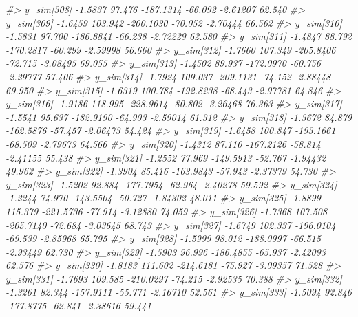 \documentclass[
  10pt,
  italian,
  a4paper,
  extrafontsizes,onecolumn,openright
  ]{memoir}
\newenvironment{Shaded}{\begin{snugshade}}{\end{snugshade}}
\newcommand{\CommentTok}[1]{\textcolor[rgb]{0.56,0.35,0.01}{\textit{#1}}}
\begin{document}
\begin{Shaded}
\begin{Highlighting}[]
\CommentTok{\#\textgreater{}   y\_sim[308] {-}1.5837  97.476 {-}187.1314 {-}66.092 {-}2.61207 62.540}
\CommentTok{\#\textgreater{}   y\_sim[309] {-}1.6459 103.942 {-}200.1030 {-}70.052 {-}2.70444 66.562}
\CommentTok{\#\textgreater{}   y\_sim[310] {-}1.5831  97.700 {-}186.8841 {-}66.238 {-}2.72229 62.580}
\CommentTok{\#\textgreater{}   y\_sim[311] {-}1.4847  88.792 {-}170.2817 {-}60.299 {-}2.59998 56.660}
\CommentTok{\#\textgreater{}   y\_sim[312] {-}1.7660 107.349 {-}205.8406 {-}72.715 {-}3.08495 69.055}
\CommentTok{\#\textgreater{}   y\_sim[313] {-}1.4502  89.937 {-}172.0970 {-}60.756 {-}2.29777 57.406}
\CommentTok{\#\textgreater{}   y\_sim[314] {-}1.7924 109.037 {-}209.1131 {-}74.152 {-}2.88448 69.950}
\CommentTok{\#\textgreater{}   y\_sim[315] {-}1.6319 100.784 {-}192.8238 {-}68.443 {-}2.97781 64.846}
\CommentTok{\#\textgreater{}   y\_sim[316] {-}1.9186 118.995 {-}228.9614 {-}80.802 {-}3.26468 76.363}
\CommentTok{\#\textgreater{}   y\_sim[317] {-}1.5541  95.637 {-}182.9190 {-}64.903 {-}2.59014 61.312}
\CommentTok{\#\textgreater{}   y\_sim[318] {-}1.3672  84.879 {-}162.5876 {-}57.457 {-}2.06473 54.424}
\CommentTok{\#\textgreater{}   y\_sim[319] {-}1.6458 100.847 {-}193.1661 {-}68.509 {-}2.79673 64.566}
\CommentTok{\#\textgreater{}   y\_sim[320] {-}1.4312  87.110 {-}167.2126 {-}58.814 {-}2.41155 55.438}
\CommentTok{\#\textgreater{}   y\_sim[321] {-}1.2552  77.969 {-}149.5913 {-}52.767 {-}1.94432 49.962}
\CommentTok{\#\textgreater{}   y\_sim[322] {-}1.3904  85.416 {-}163.9843 {-}57.943 {-}2.37379 54.730}
\CommentTok{\#\textgreater{}   y\_sim[323] {-}1.5202  92.884 {-}177.7954 {-}62.964 {-}2.40278 59.592}
\CommentTok{\#\textgreater{}   y\_sim[324] {-}1.2244  74.970 {-}143.5504 {-}50.727 {-}1.84302 48.011}
\CommentTok{\#\textgreater{}   y\_sim[325] {-}1.8899 115.379 {-}221.5736 {-}77.914 {-}3.12880 74.059}
\CommentTok{\#\textgreater{}   y\_sim[326] {-}1.7368 107.508 {-}205.7140 {-}72.684 {-}3.03645 68.743}
\CommentTok{\#\textgreater{}   y\_sim[327] {-}1.6749 102.337 {-}196.0104 {-}69.539 {-}2.85968 65.795}
\CommentTok{\#\textgreater{}   y\_sim[328] {-}1.5999  98.012 {-}188.0997 {-}66.515 {-}2.93449 62.730}
\CommentTok{\#\textgreater{}   y\_sim[329] {-}1.5903  96.996 {-}186.4855 {-}65.937 {-}2.42093 62.576}
\CommentTok{\#\textgreater{}   y\_sim[330] {-}1.8183 111.602 {-}214.6181 {-}75.927 {-}3.09357 71.528}
\CommentTok{\#\textgreater{}   y\_sim[331] {-}1.7693 109.585 {-}210.0297 {-}74.215 {-}2.92535 70.388}
\CommentTok{\#\textgreater{}   y\_sim[332] {-}1.3261  82.344 {-}157.9111 {-}55.771 {-}2.16710 52.561}
\CommentTok{\#\textgreater{}   y\_sim[333] {-}1.5094  92.846 {-}177.8775 {-}62.841 {-}2.38616 59.441}

\end{Highlighting}
\end{Shaded}
\end{document}
